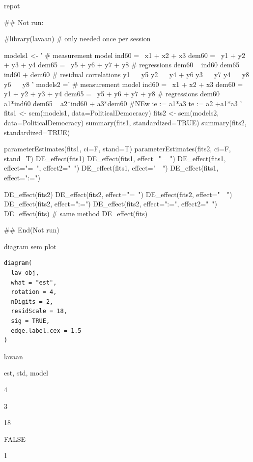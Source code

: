 \documentclass[a4paper]{book}
\begin{document}
%
\begin{Value}
repot
\end{Value}
%
\begin{Examples}
\begin{ExampleCode}
\#\# Not run: 

 #library(lavaan) # only needed once per session

models1 <- '
  # measurement model
    ind60 =~ x1 + x2 + x3
    dem60 =~ y1 + y2 + y3 + y4
    dem65 =~ y5 + y6 + y7 + y8
    # regressions
    dem60 ~ ind60
    dem65 ~ ind60 + dem60
      # residual correlations
    y1 ~~ y5
    y2 ~~ y4 + y6
    y3 ~~ y7
    y4 ~~ y8
    y6 ~~ y8
'
models2 ='
  # measurement model
    ind60 =~ x1 + x2 + x3
    dem60 =~ y1 + y2 + y3 + y4
    dem65 =~ y5 + y6 + y7 + y8
     # regressions
    dem60 ~ a1*ind60
    dem65 ~ a2*ind60 + a3*dem60
 #NEw
   ie := a1*a3
   te := a2 +a1*a3
'
fits1 <- sem(models1, data=PoliticalDemocracy)
fits2 <- sem(models2, data=PoliticalDemocracy)
summary(fits1, standardized=TRUE)
summary(fits2, standardized=TRUE)

parameterEstimates(fits1, ci=F, stand=T)
parameterEstimates(fits2, ci=F, stand=T)
DE_effect(fits1)
DE_effect(fits1, effect="=~")
DE_effect(fits1, effect="=~", effect2="~")
DE_effect(fits1, effect="~~")
DE_effect(fits1, effect=":=")

DE_effect(fits2)
DE_effect(fits2, effect="=~")
DE_effect(fits2, effect="~~")
DE_effect(fits2, effect=":=")
DE_effect(fits2, effect=":=", effect2="~")
 DE_effect(fits)%
 # same method
 DE_effect(fits)%


## End(Not run)


\end{ExampleCode}
\end{Examples}
%
\begin{Description}
diagram sem plot
\end{Description}
%
\begin{Usage}
\begin{verbatim}
diagram(
  lav_obj,
  what = "est",
  rotation = 4,
  nDigits = 2,
  residScale = 18,
  sig = TRUE,
  edge.label.cex = 1.5
)
\end{verbatim}
\end{Usage}
%
\begin{Arguments}
\begin{ldescription}
\item[\code{lav\_obj}] lavaan

\item[\code{what}] est, std, model

\item[\code{rotation}] 4

\item[\code{nDigits}] 3

\item[\code{residScale}] 18

\item[\code{sig}] FALSE

\item[\code{edge.label.cex}] 1
\end{ldescription}
\end{Arguments}
\end{document}
